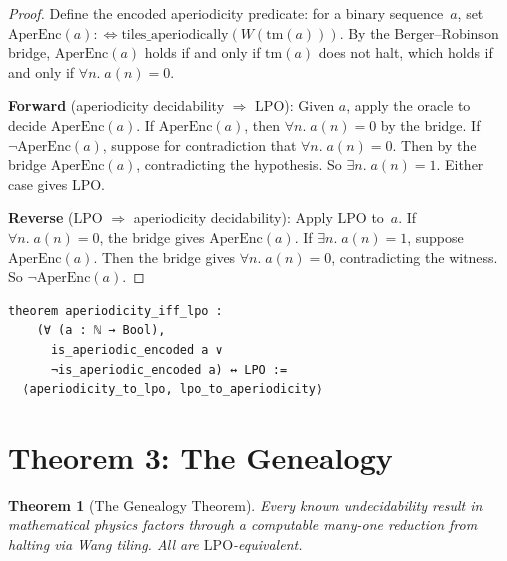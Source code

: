 \documentclass[11pt,a4paper]{article}
\theoremstyle{plain}
\newtheorem{theorem}{Theorem}[section]
\theoremstyle{definition}
\newcommand{\LPO}{\ensuremath{\mathrm{LPO}}}
\begin{document}
\begin{proof}
Define the encoded aperiodicity predicate:
for a binary sequence~$a$, set
$\mathrm{AperEnc}(a) :\Leftrightarrow
\text{tiles\_aperiodically}(W(\mathrm{tm}(a)))$.
By the Berger--Robinson bridge, $\mathrm{AperEnc}(a)$ holds if
and only if $\mathrm{tm}(a)$ does not halt, which holds if and
only if $\forall n.\; a(n) = 0$.

\textbf{Forward} (aperiodicity decidability $\Rightarrow$ \LPO):
Given $a$, apply the oracle to decide $\mathrm{AperEnc}(a)$.
If $\mathrm{AperEnc}(a)$, then $\forall n.\; a(n) = 0$ by the bridge.
If $\lnot\mathrm{AperEnc}(a)$, suppose for contradiction that
$\forall n.\; a(n) = 0$.  Then by the bridge $\mathrm{AperEnc}(a)$,
contradicting the hypothesis.  So $\exists n.\; a(n) = 1$.
Either case gives \LPO.

\textbf{Reverse} (\LPO{} $\Rightarrow$ aperiodicity decidability):
Apply \LPO{} to~$a$.
If $\forall n.\; a(n) = 0$, the bridge gives $\mathrm{AperEnc}(a)$.
If $\exists n.\; a(n) = 1$, suppose $\mathrm{AperEnc}(a)$.
Then the bridge gives $\forall n.\; a(n) = 0$,
contradicting the witness. So $\lnot\mathrm{AperEnc}(a)$.
\end{proof}

\begin{lstlisting}[caption={Aperiodicity $\leftrightarrow$ \LPO: \texttt{Aperiodicity.lean}}]
theorem aperiodicity_iff_lpo :
    (∀ (a : ℕ → Bool),
      is_aperiodic_encoded a ∨
      ¬is_aperiodic_encoded a) ↔ LPO :=
  ⟨aperiodicity_to_lpo, lpo_to_aperiodicity⟩
\end{lstlisting}

\section{Theorem 3: The Genealogy}\label{sec:genealogy}

\begin{theorem}[The Genealogy Theorem]\label{thm:genealogy}
Every known undecidability result in mathematical physics
factors through a computable many-one reduction from halting
via Wang tiling.  All are \LPO-equivalent.
\end{theorem}
\end{document}
